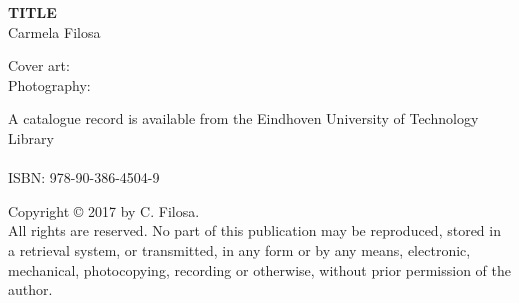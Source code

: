 
\thispagestyle{plain}

\vspace*{4cm}

\begin{center}
{\Huge \textbf{TITLE}}\\
\vspace{1cm}
{\huge{Carmela Filosa}}
\end{center}



\clearpage
\thispagestyle{plain}

\vspace*{\fill}



\noindent Cover art: \\
Photography: 

\vspace{1cm}

\noindent A catalogue record is available from the Eindhoven University of Technology Library\\
\\
\noindent ISBN: 978-90-386-4504-9\\

\vspace{1cm}

\noindent Copyright \copyright{} 2017 by C. Filosa. \\
All rights are reserved. No part of this publication may be reproduced, stored in a retrieval system, or transmitted, in any form or by any means, electronic, mechanical, photocopying, recording or otherwise, without prior permission of the author.

\clearpage


\thispagestyle{plain}


